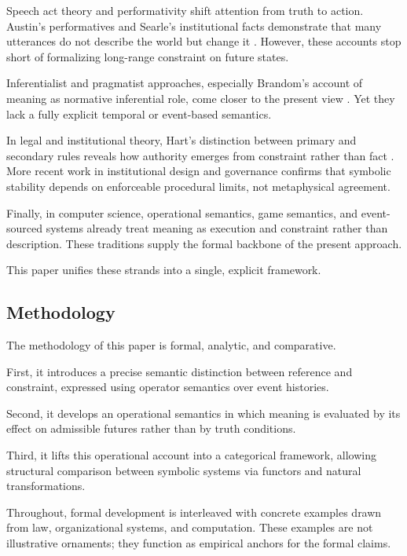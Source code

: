 \documentclass[11pt]{article}
\begin{document}
Speech act theory and performativity shift attention from truth to action.
Austin’s performatives and Searle’s institutional facts demonstrate that many
utterances do not describe the world but change it \cite{austin1962,searle1969}.
However, these accounts stop short of formalizing long-range constraint on future
states.

Inferentialist and pragmatist approaches, especially Brandom’s account of meaning
as normative inferential role, come closer to the present view
\cite{brandom1994}. Yet they lack a fully explicit temporal or event-based
semantics.

In legal and institutional theory, Hart’s distinction between primary and
secondary rules reveals how authority emerges from constraint rather than fact
\cite{hart1961}. More recent work in institutional design and governance confirms
that symbolic stability depends on enforceable procedural limits, not metaphysical
agreement.

Finally, in computer science, operational semantics, game semantics, and
event-sourced systems already treat meaning as execution and constraint rather
than description. These traditions supply the formal backbone of the present
approach.

This paper unifies these strands into a single, explicit framework.

\subsection{Methodology}

The methodology of this paper is formal, analytic, and comparative.

First, it introduces a precise semantic distinction between reference and
constraint, expressed using operator semantics over event histories.

Second, it develops an operational semantics in which meaning is evaluated by its
effect on admissible futures rather than by truth conditions.

Third, it lifts this operational account into a categorical framework, allowing
structural comparison between symbolic systems via functors and natural
transformations.

Throughout, formal development is interleaved with concrete examples drawn from
law, organizational systems, and computation. These examples are not illustrative
ornaments; they function as empirical anchors for the formal claims.
\end{document}
